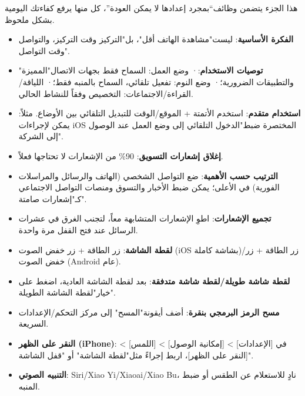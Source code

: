 
هذا الجزء يتضمن وظائف“بمجرد إعدادها لا يمكن العودة”، كل منها يرفع كفاءتك اليومية بشكل ملحوظ.


\begin{itemize}
  \item \textbf{الفكرة الأساسية}: ليست"مشاهدة الهاتف أقل"، بل"التركيز وقت التركيز، والتواصل وقت التواصل".
  \item \textbf{توصيات الاستخدام}:\newline · وضع العمل: السماح فقط بجهات الاتصال"المميزة" والتطبيقات الضرورية؛\newline · وضع النوم: تفعيل تلقائي، السماح بالمنبه فقط؛\newline · اللياقة/القراءة/الاجتماعات: التخصيص وفقاً للنشاط الحالي.
  \item \textbf{استخدام متقدم}: استخدم الأتمتة + الموقع/الوقت للتبديل التلقائي بين الأوضاع. مثلاً: يمكن لإجراءات iOS المختصرة ضبط"الدخول التلقائي إلى وضع العمل عند الوصول إلى الشركة".
\end{itemize}


\begin{itemize}
  \item \textbf{إغلاق إشعارات التسويق}: 90\% من الإشعارات لا تحتاجها فعلاً.
  \item \textbf{الترتيب حسب الأهمية}: ضع التواصل الشخصي (الهاتف والرسائل والمراسلات الفورية) في الأعلى؛ يمكن ضبط الأخبار والتسوق ومنصات التواصل الاجتماعي كـ"إشعارات صامتة".
  \item \textbf{تجميع الإشعارات}: اطوِ الإشعارات المتشابهة معاً، لتجنب الغرق في عشرات الرسائل عند فتح القفل مرة واحدة.
\end{itemize}


\begin{itemize}
  \item \textbf{لقطة الشاشة}: زر الطاقة + زر خفض الصوت (iOS بشاشة كاملة)/زر الطاقة + زر خفض الصوت (Android عام).
  \item \textbf{لقطة شاشة طويلة/لقطة شاشة متدفقة}: بعد لقطة الشاشة العادية، اضغط على خيار"لقطة الشاشة الطويلة".
  \item \textbf{مسح الرمز البرمجي بنقرة}: أضف أيقونة"المسح" إلى مركز التحكم/الإعدادات السريعة.
  \item \textbf{النقر على الظهر (iPhone)}: في [الإعدادات] > [إمكانية الوصول] > [اللمس] > [النقر على الظهر]، اربط إجراءً مثل"لقطة الشاشة" أو "قفل الشاشة".
  \item \textbf{التنبيه الصوتي}: Siri/Xiao Yi/Xiaoai/Xiao Bu، نادٍ للاستعلام عن الطقس أو ضبط المنبه.
\end{itemize}

